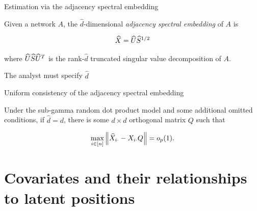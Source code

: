 \documentclass{beamer}
\theoremstyle{remark}
\begin{document}
\begin{frame}{Estimation via the adjacency spectral embedding}


    \begin{definition}[ASE]

        Given a network $A$, the $\widehat{d}$-dimensional \emph{adjacency spectral embedding} of $A$ is

        \begin{align*}
            \widehat{X} = \widehat{U} \widehat{S}^{1/2}
        \end{align*}

        \noindent where $\widehat{U} \widehat{S} \widehat{U}^T$ is the rank-$\widehat{d}$ truncated singular value decomposition of $A$.

    \end{definition}

    The analyst must specify $\widehat{d}$

\end{frame}

\begin{frame}{Uniform consistency of the adjacency spectral embedding}

    \begin{lemma}

        Under the sub-gamma random dot product model and some additional omitted conditions, if $\widehat{d} = d$, there is some $d \times d$ orthogonal matrix $Q$ such that

        \begin{equation*}
            \max_{i \in [n]} \, \norm*{\Xhat_{i \cdot} - \X_{i \cdot} Q} = \op{1}.
        \end{equation*}

    \end{lemma}

\end{frame}

\section{Covariates and their relationships to latent positions}
\end{document}
